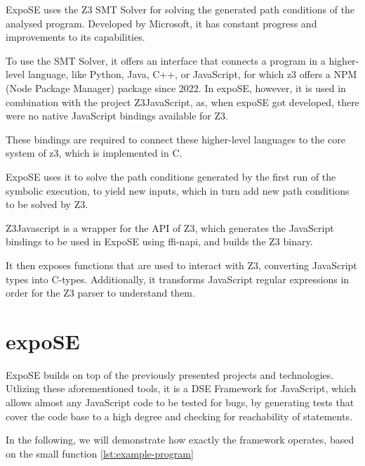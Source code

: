 ExpoSE uses the Z3 SMT Solver \cite{de_moura_z3_2008} for solving the generated path conditions of the analysed program. Developed by Microsoft, it has constant progress and improvements to its capabilities.

To use the SMT Solver, it offers an interface that connects a program in a higher-level language, like Python, Java, C++, or JavaScript, for which z3 offers a NPM (Node Package Manager) package since 2022. In expoSE, however, it is used in combination with the project Z3JavaScript, as, when expoSE got developed, there were no native JavaScript bindings available for Z3. 

These bindings are required to connect these higher-level languages to the core system of z3, which is implemented in C.

ExpoSE uses it to solve the path conditions generated by the first run of the symbolic execution, to yield new inputs, which in turn add new path conditions to be solved by Z3. 


Z3Javascript is a wrapper for the API of Z3, which generates the JavaScript bindings to be used in ExpoSE using ffi-napi, and builds the Z3 binary.

It then exposes functions that are used to interact with Z3, converting JavaScript types into C-types. 
Additionally, it transforms JavaScript regular expressions in order for the Z3 parser to understand them.






\section{expoSE}
\label{sec:expose}
ExpoSE builds on top of the previously presented projects and technologies. Utlizing these aforementioned tools, it is a DSE Framework for JavaScript, which allows almost any JavaScript code to be tested for bugs, by generating tests that cover the code base to a high degree and checking for reachability of statements. \cite{loring_expose_2017}

In the following, we will demonstrate how exactly the framework operates, based on the small function \autoref{lst:example-program}
 
